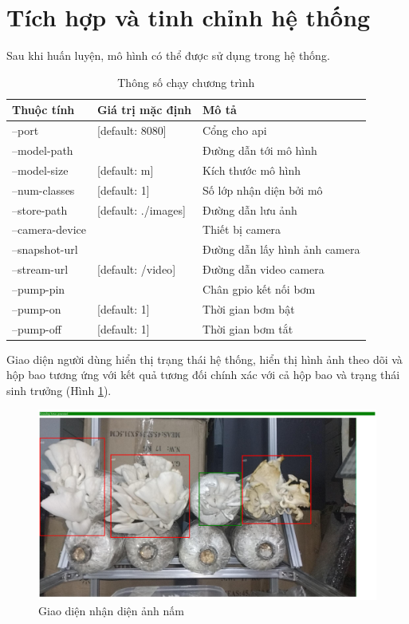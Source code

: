 \section{Tích hợp và tinh chỉnh hệ thống}
Sau khi huấn luyện, mô hình có thể được sử dụng trong hệ thống. 



\begin{table}[H]
\centering
\caption{Thông số chạy chương trình}
\label{tab:run-command}
\begin{tabular}{|l|l|l|}
\hline
\textbf{Thuộc tính} & \textbf{Giá trị mặc định} & \textbf{Mô tả}                     \\ \hline
--port              & {[}default: 8080{]}       & Cổng cho api                       \\ \hline
--model-path        &                           & Đường dẫn tới mô hình              \\ \hline
--model-size        & {[}default: m{]}          & Kích thước mô hình \\ \hline
--num-classes       & {[}default: 1{]}          & Số lớp nhận diện bởi mô            \\ \hline
--store-path        & {[}default: ./images{]}   & Đường dẫn lưu ảnh                  \\ \hline
--camera-device     &                           & Thiết bị camera                    \\ \hline
--snapshot-url      &                           & Đường dẫn lấy hình ảnh camera      \\ \hline
--stream-url        & {[}default: /video{]}     & Đường dẫn video camera             \\ \hline
--pump-pin          &                           & Chân gpio kết nối bơm              \\ \hline
--pump-on           & {[}default: 1{]}          & Thời gian bơm bật                  \\ \hline
--pump-off          & {[}default: 1{]}          & Thời gian bơm tắt                  \\ \hline
\end{tabular}
\end{table}

Giao diện người dùng hiển thị trạng thái hệ thống, hiển thị hình ảnh theo dõi và hộp bao tương ứng với kết quả tương đối chính xác với cả hộp bao và trạng thái sinh trưởng (Hình \ref{fig:user-interface}).
\begin{figure}[H]
    \centering
    \includegraphics[width=0.75\linewidth]{images/user-interface.png}
    \caption{Giao diện nhận diện ảnh nấm}
    \label{fig:user-interface}
\end{figure}


